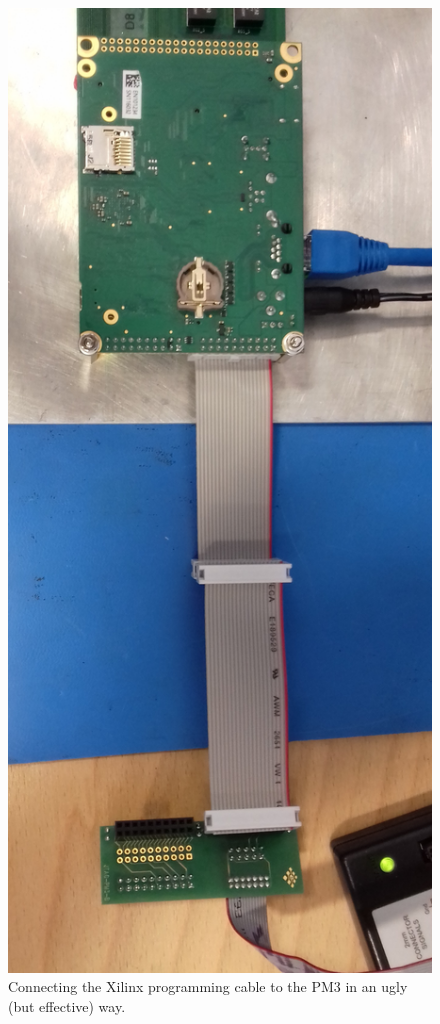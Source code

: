 \begin{figure}
  \centering
  \includegraphics[width=.80\textwidth]{./Images/XilinxCable.jpg}
  \caption{Connecting the Xilinx programming cable to the PM3 in an ugly (but effective) way.}\label{fig:XilinxCable}
\end{figure}
